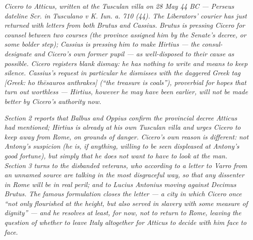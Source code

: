 
\textit{Cicero to Atticus, written at the Tusculan villa on 28
May 44 BC --- Perseus dateline \textit{Scr. in Tusculano v K.
Iun. a. 710 (44)}. The Liberators' courier has just returned
with letters from both Brutus and Cassius. Brutus is pressing
Cicero for counsel between two courses (the province assigned
him by the Senate's decree, or some bolder step); Cassius is
pressing him to make Hirtius --- the consul-designate and
Cicero's own former pupil --- as well-disposed to their cause
as possible. Cicero registers blank dismay: he has nothing to
write and means to keep silence. Cassius's request in
particular he dismisses with the daggered Greek tag
\textit{[Greek: ho th\=esauros anthrakes]} (``the treasure is
coals''), proverbial for hopes that turn out worthless ---
Hirtius, however he may have been earlier, will not be made
better by Cicero's authority now.}

\textit{Section 2 reports that Balbus and Oppius confirm the
provincial decree Atticus had mentioned; Hirtius is already
at his own Tusculan villa and urges Cicero to keep away from
Rome, on grounds of danger. Cicero's own reason is different:
not Antony's suspicion (he is, if anything, willing to be seen
displeased at Antony's good fortune), but simply that he does
not want to have to look at the man. Section 3 turns to the
disbanded veterans, who according to a letter to Varro from an
unnamed source are talking in the most disgraceful way, so
that any dissenter in Rome will be in real peril; and to
Lucius Antonius moving against Decimus Brutus. The famous
formulation closes the letter --- a city in which Cicero once
``not only flourished at the height, but also served in
slavery with some measure of dignity'' --- and he resolves at
least, for now, not to return to Rome, leaving the question of
whether to leave Italy altogether for Atticus to decide with
him face to face.}
